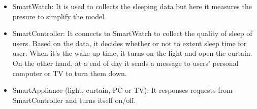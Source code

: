 \documentclass[a4paper]{article}
\begin{document}
\begin{itemize}
    \item SmartWatch: It is used to collects the sleeping data but here it
        measures the presure to simplify the model.
    \item SmartController: It connects to SmartWatch to collect the quality of
        sleep of users. Based on the data, it decides whether or not to extent
        sleep time for user. When it's the wake-up time, it turns on the light
        and open the curtain. On the other hand, at a end of day it sends a
        message to users' personal computer or TV to turn them down.
    \item SmartAppliance (light, curtain, PC or TV): It responses requests from
        SmartController and turns itself on/off.
\end{itemize}




\end{document}
